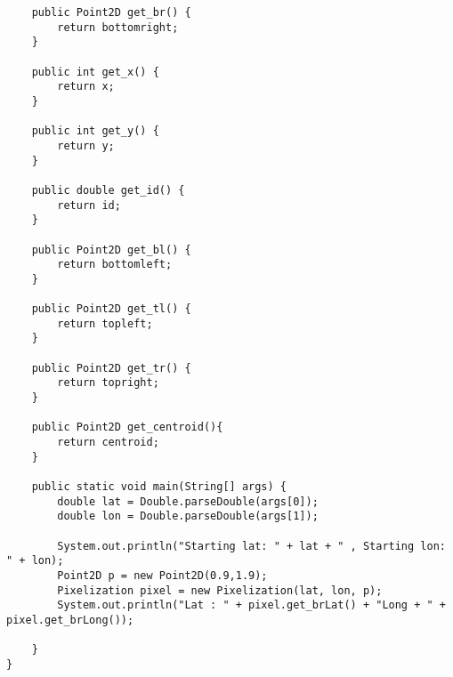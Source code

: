 \begin{verbatim}
	public Point2D get_br() {
		return bottomright;
	}

	public int get_x() {
		return x;
	}

	public int get_y() {
		return y;
	}

	public double get_id() {
		return id;
	}

	public Point2D get_bl() {
		return bottomleft;
	}

	public Point2D get_tl() {
		return topleft;
	}

	public Point2D get_tr() {
		return topright;
	}

    public Point2D get_centroid(){
        return centroid;
    }

    public static void main(String[] args) {
    	double lat = Double.parseDouble(args[0]);
    	double lon = Double.parseDouble(args[1]);

    	System.out.println("Starting lat: " + lat + " , Starting lon: " + lon);
    	Point2D p = new Point2D(0.9,1.9);
    	Pixelization pixel = new Pixelization(lat, lon, p);
    	System.out.println("Lat : " + pixel.get_brLat() + "Long + " + pixel.get_brLong());

    }
}
\end{verbatim}
